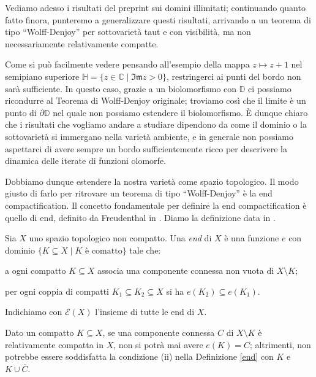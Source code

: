 Vediamo adesso i risultati del preprint \cite{BZ2} sui domini illimitati; continuando quanto fatto finora, punteremo a generalizzare questi risultati, arrivando a un teorema di tipo ``Wolff-Denjoy'' per sottovarietà taut e con visibilità, ma non necessariamente relativamente compatte.

Come si può facilmente vedere pensando all'esempio della mappa $z\longmapsto z+1$ nel semipiano superiore $\mathbb{H}=\{z\in\mathbb{C}\mid\mathfrak{Im}z>0\}$, restringerci ai punti del bordo non sarà sufficiente. In questo caso, grazie a un biolomorfismo con $\mathbb{D}$ ci possiamo ricondurre al Teorema di Wolff-Denjoy originale; troviamo così che il limite è un punto di $\partial\mathbb{D}$ nel quale non possiamo estendere il biolomorfismo. È dunque chiaro che i risultati che vogliamo andare a studiare dipendono da come il dominio o la sottovarietà si immergano nella varietà ambiente, e in generale non possiamo aspettarci di avere sempre un bordo sufficientemente ricco per descrivere la dinamica delle iterate di funzioni olomorfe.

Dobbiamo dunque estendere la nostra varietà come spazio topologico. Il modo giusto di farlo per ritrovare un teorema di tipo ``Wolff-Denjoy'' è la end compactification. Il concetto fondamentale per definire la end compactification è quello di end, definito da Freudenthal in \cite{F}. Diamo la definizione data in \cite[Chapter 1, Problem 19]{Sp}.

\begin{defn} \label{end}
    Sia $X$ uno spazio topologico non compatto. Una \textit{end} di $X$ è una funzione $e$ con dominio $\{K\subseteq X\mid K\text{ è comatto}\}$ tale che:
    \begin{nlist}
        \item a ogni compatto $K\subseteq X$ associa una componente connessa non vuota di $X\setminus K$;
        \item per ogni coppia di compatti $K_1\subseteq K_2\subseteq X$ si ha $e(K_2)\subseteq e(K_1)$.
    \end{nlist}
    Indichiamo con $\mathcal{E}(X)$ l'insieme di tutte le end di $X$.
\end{defn}

\begin{oss} \label{endnonrelcpt}
    Dato un compatto $K\subseteq X$, se una componente connessa $C$ di $X\setminus K$ è relativamente compatta in $X$, non si potrà mai avere $e(K)=C$; altrimenti, non potrebbe essere soddisfatta la condizione (ii) nella Definizione \ref{end} con $K$ e $K\cup\overline{C}$.
\end{oss}

